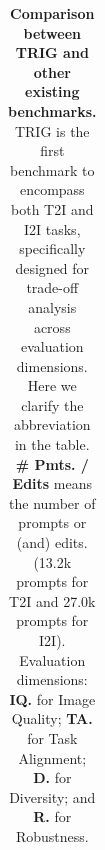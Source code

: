 \begin{table}[!t]
{\begin{tabular}{lcccccccc}
\bottomrule
\end{tabular}
}
\vspace{-5pt}
\caption{\textbf{Comparison between TRIG and other existing benchmarks.}
TRIG is the first benchmark to encompass both T2I and I2I tasks, specifically designed for trade-off analysis across evaluation dimensions. Here we clarify the abbreviation in the table. \textbf{\# Pmts. / Edits} means the number of prompts or (and) edits. (13.2k prompts for T2I and 27.0k prompts for I2I). Evaluation dimensions: \textbf{IQ.} for Image Quality; \textbf{TA.} for Task Alignment; \textbf{D.} for Diversity; and \textbf{R.} for Robustness.
}
\label{tab:pre_bench}
\vspace{-0.5cm}
\end{table}

